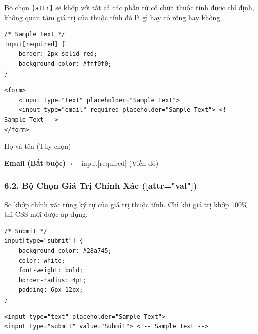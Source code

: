 \documentclass[11pt,oneside]{book}
\newcommand{\codeinline}[1]{\textcolor{accentOrange}{\texttt{#1}}}
\begin{document}
\begin{conceptBox}
Bộ chọn \codeinline{[attr]} sẽ khớp với tất cả các phần tử có chứa thuộc tính được chỉ định, không quan tâm giá trị của thuộc tính đó là gì hay có rỗng hay không.
\end{conceptBox}

\begin{codeWindow}
\begin{lstlisting}[language=CSS3]
/* Sample Text */
input[required] {
    border: 2px solid red;
    background-color: #fff0f0;
}
\end{lstlisting}

\begin{lstlisting}[language=HTML5]
<form>
    <input type="text" placeholder="Sample Text">
    <input type="email" required placeholder="Sample Text"> <!-- Sample Text -->
</form>
\end{lstlisting}
\end{codeWindow}

\begin{browserWindow}
\sffamily\small
\begin{tcolorbox}[arc=2pt, colback=white, colframe=gray!30, boxrule=1pt, width=7.5cm]
\textcolor{gray!70}{Họ và tên (Tùy chọn)} \par\vspace{4pt}
\begin{tcolorbox}[arc=2pt, colback=red!5, colframe=red!70, boxrule=1.5pt, boxsep=2pt]
\textcolor{red!80!black}{\textbf{Email (Bắt buộc)}} \hfill \textcolor{red!70}{\scriptsize $\leftarrow$ input[required] (Viền đỏ)}
\end{tcolorbox}
\end{tcolorbox}
\end{browserWindow}

\subsubsection{6.2. Bộ Chọn Giá Trị Chính Xác ([attr="val"])}

\begin{conceptBox}
So khớp chính xác từng ký tự của giá trị thuộc tính. Chỉ khi giá trị khớp 100\% thì CSS mới được áp dụng.
\end{conceptBox}

\begin{codeWindow}
\begin{lstlisting}[language=CSS3]
/* Submit */
input[type="submit"] {
    background-color: #28a745;
    color: white;
    font-weight: bold;
    border-radius: 4pt;
    padding: 6px 12px;
}
\end{lstlisting}

\begin{lstlisting}[language=HTML5]
<input type="text" placeholder="Sample Text">
<input type="submit" value="Submit"> <!-- Sample Text -->
\end{lstlisting}
\end{codeWindow}
\end{document}
